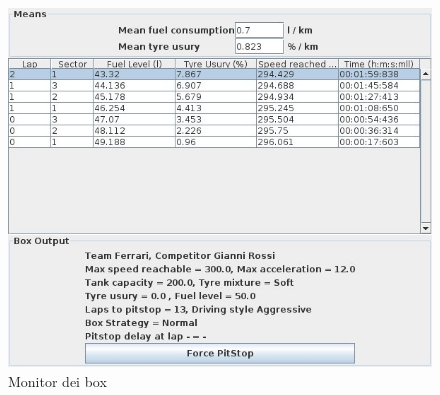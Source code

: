\begin{center}
\begin{figure}[H]
	\includegraphics[scale=0.75]{screenshotRelazione/box3.jpeg}
	\caption{Monitor dei box}
\end{figure}
\end{center}
